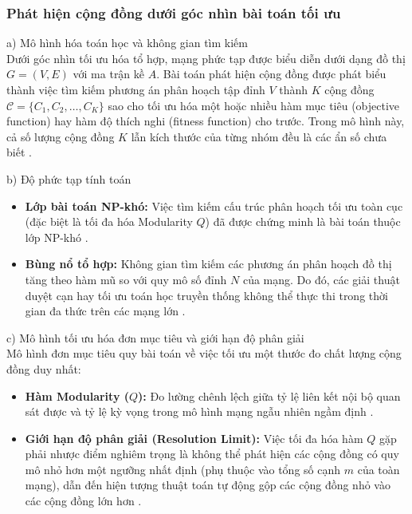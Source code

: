 \documentclass[14pt,a4paper]{extarticle}
\begin{document}
\subsubsection{Phát hiện cộng đồng dưới góc nhìn bài toán tối ưu}

\noindent a) Mô hình hóa toán học và không gian tìm kiếm
\\
Dưới góc nhìn tối ưu hóa tổ hợp, mạng phức tạp được biểu diễn dưới dạng đồ thị $G=(V,E)$ với ma trận kề $A$. Bài toán phát hiện cộng đồng được phát biểu thành việc tìm kiếm phương án phân hoạch tập đỉnh $V$ thành $K$ cộng đồng $\mathcal{C} = \{C_1, C_2, \dots, C_K\}$ sao cho tối ưu hóa một hoặc nhiều hàm mục tiêu (objective function) hay hàm độ thích nghi (fitness function) cho trước. Trong mô hình này, cả số lượng cộng đồng $K$ lẫn kích thước của từng nhóm đều là các ẩn số chưa biết \cite{Beldi2025}.

\noindent b) Độ phức tạp tính toán
\begin{itemize}
    \item \textbf{Lớp bài toán NP-khó:} Việc tìm kiếm cấu trúc phân hoạch tối ưu toàn cục (đặc biệt là tối đa hóa Modularity $Q$) đã được chứng minh là bài toán thuộc lớp NP-khó \cite{Fortunato2010}.
    \item \textbf{Bùng nổ tổ hợp:} Không gian tìm kiếm các phương án phân hoạch đồ thị tăng theo hàm mũ so với quy mô số đỉnh $N$ của mạng. Do đó, các giải thuật duyệt cạn hay tối ưu toán học truyền thống không thể thực thi trong thời gian đa thức trên các mạng lớn \cite{Baraa2021, Gong2016}.
\end{itemize}

\noindent c) Mô hình tối ưu hóa đơn mục tiêu và giới hạn độ phân giải
\\
Mô hình đơn mục tiêu quy bài toán về việc tối ưu một thước đo chất lượng cộng đồng duy nhất:
\begin{itemize}
    \item \textbf{Hàm Modularity ($Q$):} Đo lường chênh lệch giữa tỷ lệ liên kết nội bộ quan sát được và tỷ lệ kỳ vọng trong mô hình mạng ngẫu nhiên ngầm định \cite{Beldi2025}.
    \item \textbf{Giới hạn độ phân giải (Resolution Limit):} Việc tối đa hóa hàm $Q$ gặp phải nhược điểm nghiêm trọng là không thể phát hiện các cộng đồng có quy mô nhỏ hơn một ngưỡng nhất định (phụ thuộc vào tổng số cạnh $m$ của toàn mạng), dẫn đến hiện tượng thuật toán tự động gộp các cộng đồng nhỏ vào các cộng đồng lớn hơn \cite{Gong2016}.
\end{itemize}
\end{document}
